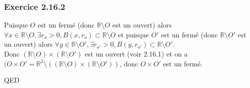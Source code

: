 \documentclass[]{book}
\theoremstyle{definition}
\newcommand{\bb}[1]{\mathbb{#1}}
\newcommand{\R}{\bb{R}}
\begin{document}
\subsubsection*{Exercice 2.16.2}
Puisque $O$ est un ferm\'e (donc $\R \setminus O$ est un ouvert) alors $\forall x \in \R \setminus O, \exists r_{o} > 0 , B(x,r_{o}) \subset \R \setminus O$ et puisque $O'$ est un ferm\'e (donc $\R \setminus O'$ est un ouvert) alors $\forall y \in \R \setminus O', \exists r_{o'} > 0 , B(y,r_{o'}) \subset \R \setminus O'$. \\

Donc $(\R \setminus O) \times (\R \setminus O')$ est un ouvert (voir 2.16.1) et on a $(O \times O' = \R^2 \setminus ((\R \setminus O) \times (\R \setminus O'))$, donc $O \times O'$ est un ferm\'e.

   

QED
\end{document}

